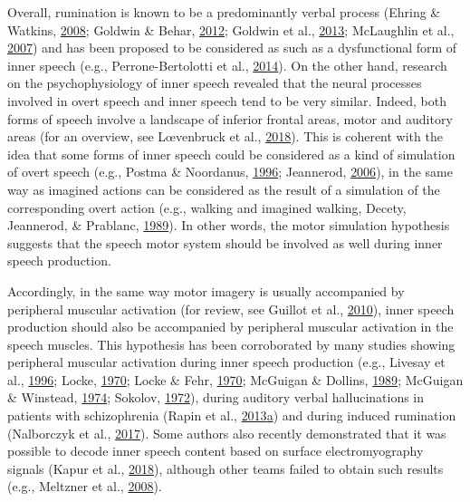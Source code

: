 \documentclass[a4paper,12pt,twoside,openright,oldfontcommands,final]{memoir}
\begin{document}
Overall, rumination is known to be a predominantly verbal process (Ehring \& Watkins, \protect\hyperlink{ref-ehring_repetitive_2008}{2008}; Goldwin \& Behar, \protect\hyperlink{ref-goldwin_concreteness_2012}{2012}; Goldwin et al., \protect\hyperlink{ref-goldwin_concreteness_2013}{2013}; McLaughlin et al., \protect\hyperlink{ref-mclaughlin_effects_2007}{2007}) and has been proposed to be considered as such as a dysfunctional form of inner speech (e.g., Perrone-Bertolotti et al., \protect\hyperlink{ref-Perrone-Bertolotti2014}{2014}). On the other hand, research on the psychophysiology of inner speech revealed that the neural processes involved in overt speech and inner speech tend to be very similar. Indeed, both forms of speech involve a landscape of inferior frontal areas, motor and auditory areas (for an overview, see Lœvenbruck et al., \protect\hyperlink{ref-loevenbruck_cognitive_2018}{2018}). This is coherent with the idea that some forms of inner speech could be considered as a kind of simulation of overt speech (e.g., Postma \& Noordanus, \protect\hyperlink{ref-postma_production_1996}{1996}; Jeannerod, \protect\hyperlink{ref-jeannerod_motor_2006}{2006}), in the same way as imagined actions can be considered as the result of a simulation of the corresponding overt action (e.g., walking and imagined walking, Decety, Jeannerod, \& Prablanc, \protect\hyperlink{ref-decety_timing_1989}{1989}). In other words, the motor simulation hypothesis suggests that the speech motor system should be involved as well during inner speech production.

Accordingly, in the same way motor imagery is usually accompanied by peripheral muscular activation (for review, see Guillot et al., \protect\hyperlink{ref-guillot_electromyographic_2010}{2010}), inner speech production should also be accompanied by peripheral muscular activation in the speech muscles. This hypothesis has been corroborated by many studies showing peripheral muscular activation during inner speech production (e.g., Livesay et al., \protect\hyperlink{ref-livesay_covert_1996}{1996}; Locke, \protect\hyperlink{ref-locke_subvocal_1970-1}{1970}; Locke \& Fehr, \protect\hyperlink{ref-locke_subvocal_1970}{1970}; McGuigan \& Dollins, \protect\hyperlink{ref-mcguigan_patterns_1989}{1989}; McGuigan \& Winstead, \protect\hyperlink{ref-mcguigan_discriminative_1974}{1974}; Sokolov, \protect\hyperlink{ref-sokolov_inner_1972}{1972}), during auditory verbal hallucinations in patients with schizophrenia (Rapin et al., \protect\hyperlink{ref-rapin_emg_2013}{2013}\protect\hyperlink{ref-rapin_emg_2013}{a}) and during induced rumination (Nalborczyk et al., \protect\hyperlink{ref-nalborczyk_orofacial_2017}{2017}). Some authors also recently demonstrated that it was possible to decode inner speech content based on surface electromyography signals (Kapur et al., \protect\hyperlink{ref-kapur_alterego_2018}{2018}), although other teams failed to obtain such results (e.g., Meltzner et al., \protect\hyperlink{ref-meltzner_speech_2008}{2008}).
\end{document}
